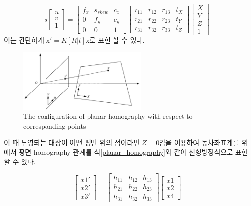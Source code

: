 \documentclass[master,korean,final]{cbnu-ecs}
\begin{document}
\begin{equation}
s\begin{bmatrix} u\\v\\1 \end{bmatrix} = \begin{bmatrix} f_{x} & s_{skew} & c_{x} \\ 0 & f_{y} & c_{y} \\ 0 & 0 & 1 \end{bmatrix}\begin{bmatrix} r_{11} & r_{12} & r_{13} & t_{X} \\ r_{21} & r_{22} & r_{23} & t_{Y}\\ r_{31} & r_{32} & r_{33} & t_{Z} \end{bmatrix}\begin{bmatrix} X\\Y\\Z\\1 \end{bmatrix} \label{pinhole}
\end{equation}
이는 간단하게 $\mathrm{x}'=K[R|t]\mathrm{x}$로 표현 할 수 있다.
\begin{figure}[!ht]
  \centering
	\includegraphics[width=240px]{img/planar_homography_cropped.pdf}
  \caption{The configuration of planar homography with respect to corresponding points }
\label{planar_homography}
\end{figure}
이 때 투영되는 대상이 어떤 평면 위의 점이라면 $Z=0$임을 이용하여 동차좌표계를 위에서 평면 homography 관계를 식\eqref{planar_homography}와 같이 선형방정식으로 표현할 수 있다.

\begin{equation}
\begin{bmatrix} x1'\\x2'\\x3' \end{bmatrix} = \begin{bmatrix} h_{11} & h_{12} & h_{13} \\ h_{21} & h_{22} & h_{23} \\ h_{31} & h_{32} & h_{33} \end{bmatrix}\begin{bmatrix} x1\\x2\\x4 \end{bmatrix} \label{planar_homography}
\end{equation}
\end{document}
